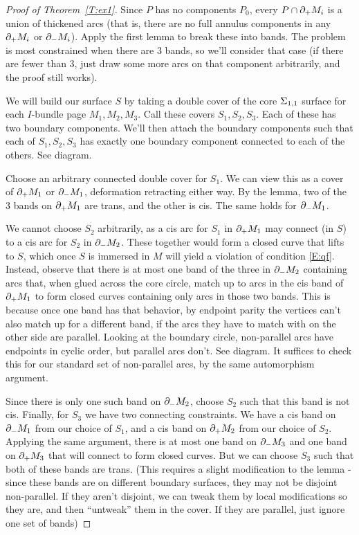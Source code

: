 \begin{proof}[Proof of Theorem~\ref{T:ex1}]

Since $P$ has no components $P_0$, every $P \cap \partial_+M_i$ is a union of
thickened arcs (that is, there are no full annulus components in any $\partial_+M_i$
or $\partial_-M_i$). Apply the first lemma to break these into bands. The problem is
most constrained when there are 3 bands, so we'll consider that case (if there
are fewer than 3, just draw some more arcs on that component arbitrarily, and
the proof still works).

We will build our surface $S$ by taking a double cover of the core $\Sigma_{1,1}$
surface for each $I$-bundle page $M_1,M_2,M_3$. Call these covers
$S_1,S_2,S_3$.  Each of these has two boundary components. We'll then attach
the boundary components such that each of $S_1,S_2,S_3$ has exactly one
boundary component connected to each of the others. See diagram.

Choose an arbitrary connected double cover for $S_1$. We can view this as
a cover of $\partial_+M_1$ or $\partial_-M_1$, deformation retracting either way. By the
lemma, two of the
3 bands on $\partial_+M_1$ are trans, and the other is cis. The same holds for
  $\partial_-M_1$.

We cannot choose $S_2$ arbitrarily, as a cis arc for $S_1$ in $\partial_+M_1$ may
connect (in $S$) to a cis arc for $S_2$ in $\partial_-M_2$. These together would
form a closed curve that lifts to $S$, which once $S$ is immersed in $M$ will
yield a violation of condition \eqref{E:qf}. Instead, observe that there is at
most one band of the three in $\partial_-M_2$ containing arcs that, when glued
across the core circle, match up to arcs in the cis band of $\partial_+M_1$ to form
closed curves containing only arcs in those two bands. This is because once one
band has that behavior, by endpoint parity the vertices can't also match up for
a different band, if the arcs they have to match with on the other side are
parallel. Looking at the boundary circle, non-parallel arcs have endpoints in
cyclic order, but parallel arcs don't. See diagram. It suffices to check this
for our standard set of non-parallel arcs, by the same automorphism argument.

Since there is only one such band on $\partial_-M_2$, choose $S_2$ such that this
band is not cis.  Finally, for $S_3$ we have two connecting constraints. We
have a cis band on $\partial_-M_1$ from our choice of $S_1$, and a cis band on
$\partial_+M_2$ from our choice of $S_2$.  Applying the same argument, there is at
most one band on $\partial_-M_3$ and one band on $\partial_+M_3$ that will connect to
form closed curves. But we can choose $S_3$ such that both of these bands are
trans. (This requires a slight modification to the lemma - since these bands
are on different boundary surfaces, they may not be disjoint non-parallel. If
they aren't disjoint, we can tweak them by local modifications so they are, and
then ``untweak'' them in the cover. If they are parallel, just ignore one set
of bands)


\end{proof}
